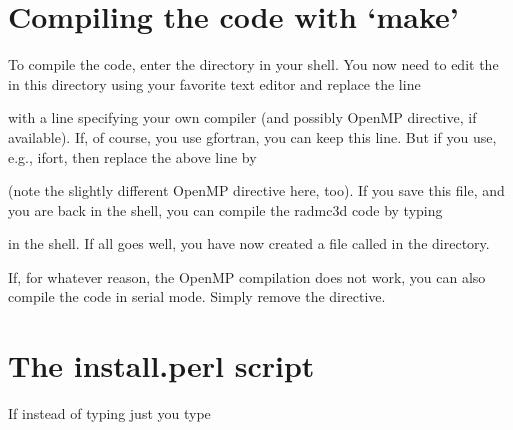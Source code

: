 \documentclass[letterpaper,10pt,english]{sphinxmanual}
\begin{document}
\section{Compiling the code with ‘make’}
\label{\detokenize{installation:compiling-the-code-with-make}}\label{\detokenize{installation:sec-makeing}}
To compile the code, enter the  directory in your shell. You now
 need to edit the  in this directory using your favorite
text editor and replace the line

\begin{sphinxVerbatim}[commandchars=\\\{\}]
   
\end{sphinxVerbatim}

with a line specifying your own compiler (and possibly OpenMP directive,
if available). If, of course, you use gfortran,
you can keep this line. But if you use, e.g., ifort, then replace the above
line by

\begin{sphinxVerbatim}[commandchars=\\\{\}]
   
\end{sphinxVerbatim}

(note the slightly different OpenMP directive here, too).
If you save this file, and you are back in the shell, you can compile the
radmc3d code by typing

\begin{sphinxVerbatim}[commandchars=\\\{\}]
\end{sphinxVerbatim}

in the shell. If all goes well, you have now created a file called 
in the  directory.

If, for whatever reason, the OpenMP compilation does not work, you can also
compile the code in serial mode. Simply remove the  directive.


\section{The install.perl script}
\label{\detokenize{installation:the-install-perl-script}}
If instead of typing just  you type
\end{document}
